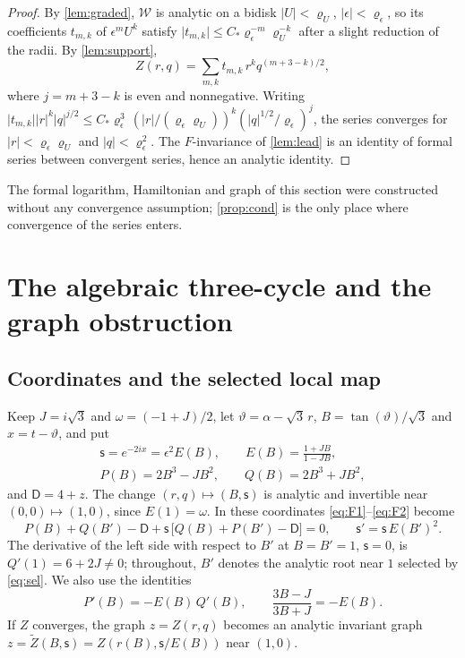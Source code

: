 \documentclass[11pt]{amsart}
\numberwithin{equation}{section}
\theoremstyle{definition}
\theoremstyle{remark}
\newcommand{\abs}[1]{\lvert #1\rvert}
\newcommand{\sD}{\mathsf D}
\newcommand{\ssf}{\mathsf s}
\begin{document}
\begin{proof}
By \cref{lem:graded}, $\mathcal W$ is analytic on a bidisk $\abs U<\varrho_U$, $\abs\epsilon<\varrho_\epsilon$, so its coefficients $t_{m,k}$ of $\epsilon^mU^k$ satisfy $\abs{t_{m,k}}\le C_*\varrho_\epsilon^{-m}\varrho_U^{-k}$ after a slight reduction of the radii. By \cref{lem:support},
\[
Z(r,q)=\sum_{m,k}t_{m,k}\,r^kq^{(m+3-k)/2},
\]
where $j=m+3-k$ is even and nonnegative. Writing $\abs{t_{m,k}}\abs r^k\abs q^{j/2}\le C_*\varrho_\epsilon^3\,(\abs r/(\varrho_\epsilon\varrho_U))^k(\abs q^{1/2}/\varrho_\epsilon)^j$, the series converges for $\abs r<\varrho_\epsilon\varrho_U$ and $\abs q<\varrho_\epsilon^2$. The $F$-invariance of \cref{lem:lead} is an identity of formal series between convergent series, hence an analytic identity.
\end{proof}

The formal logarithm, Hamiltonian and graph of this section were constructed without any convergence assumption; \cref{prop:cond} is the only place where convergence of the series enters.

\section{The algebraic three-cycle and the graph obstruction}\label{sec:cycle}

\subsection{Coordinates and the selected local map}
Keep $J=i\sqrt3$ and $\omega=(-1+J)/2$, let $\vartheta=\alpha-\sqrt3\,r$, $B=\tan(\vartheta)/\sqrt3$ and $x=t-\vartheta$, and put
\begin{gather*}
\ssf=e^{-2ix}=\epsilon^2E(B),\qquad E(B)=\frac{1+JB}{1-JB},\\
P(B)=2B^3-JB^2,\qquad Q(B)=2B^3+JB^2,
\end{gather*}
and $\sD=4+z$. The change $(r,q)\mapsto(B,\ssf)$ is analytic and invertible near $(0,0)\mapsto(1,0)$, since $E(1)=\omega$. In these coordinates \eqref{eq:F1}--\eqref{eq:F2} become
\begin{equation}\label{eq:sel}
P(B)+Q(B')-\sD+\ssf\,\bigl[Q(B)+P(B')-\sD\bigr]=0,\qquad \ssf'=\ssf\,E(B')^2 .
\end{equation}
The derivative of the left side with respect to $B'$ at $B=B'=1$, $\ssf=0$, is $Q'(1)=6+2J\ne0$; throughout, $B'$ denotes the analytic root near $1$ selected by \eqref{eq:sel}. We also use the identities
\begin{equation}\label{eq:PQE}
P'(B)=-E(B)\,Q'(B),\qquad \frac{3B-J}{3B+J}=-E(B).
\end{equation}
If $Z$ converges, the graph $z=Z(r,q)$ becomes an analytic invariant graph $z=\widetilde Z(B,\ssf)=Z(r(B),\ssf/E(B))$ near $(1,0)$.
\end{document}
